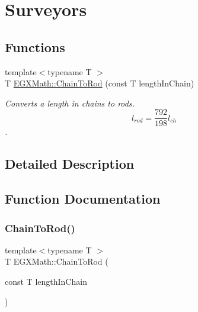\hypertarget{group___e_g_x_math-_conversions-_length_conversions-_imperial-_chain-_surveyors}{}\section{Surveyors}
\label{group___e_g_x_math-_conversions-_length_conversions-_imperial-_chain-_surveyors}
\subsection*{Functions}
\begin{DoxyCompactItemize}
\item 
{\footnotesize template$<$typename T $>$ }\\T \mbox{\hyperlink{group___e_g_x_math-_conversions-_length_conversions-_imperial-_chain-_surveyors_ga9c10d6a6603fe3761923d01523c33eea}{E\+G\+X\+Math\+::\+Chain\+To\+Rod}} (const T length\+In\+Chain)
\begin{DoxyCompactList}\small\item\em Converts a length in chains to rods. \[ l_{rod}= \frac{792}{198} l_{ch} \]. \end{DoxyCompactList}\end{DoxyCompactItemize}


\subsection{Detailed Description}


\subsection{Function Documentation}
\mbox{\label{group___e_g_x_math-_conversions-_length_conversions-_imperial-_chain-_surveyors_ga9c10d6a6603fe3761923d01523c33eea}} 
\subsubsection{\texorpdfstring{Chain\+To\+Rod()}{ChainToRod()}}
{\footnotesize\ttfamily template$<$typename T $>$ \\
T E\+G\+X\+Math\+::\+Chain\+To\+Rod (\begin{DoxyParamCaption}\item[{const T}]{length\+In\+Chain }\end{DoxyParamCaption})}



